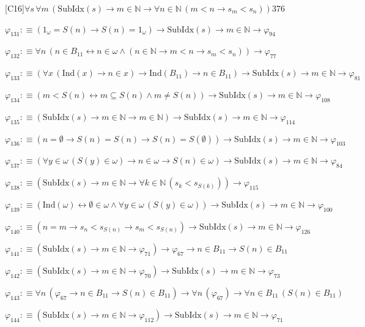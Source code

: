 \begin{fullproof}{[C16]}{$\forall s\,\forall m\,(\mathrm{SubIdx}(s) \to m \in \mathbb{N} \to \forall n \in \mathbb{N}\,(m < n \to s_{m} < s_{n}))$}{376}
\begin{abbrevlist}
\item $\varphi_{131} :\equiv (1_{\omega} = S(n) \to S(n) = 1_{\omega}) \to \mathrm{SubIdx}(s) \to m \in \mathbb{N} \to \varphi_{94}$
\item $\varphi_{132} :\equiv \forall n\,(n \in B_{11} \leftrightarrow n \in \omega \land (n \in \mathbb{N} \to m < n \to s_{m} < s_{n})) \to \varphi_{77}$
\item $\varphi_{133} :\equiv (\forall x\,(\mathrm{Ind}(x) \to n \in x) \to \mathrm{Ind}(B_{11}) \to n \in B_{11}) \to \mathrm{SubIdx}(s) \to m \in \mathbb{N} \to \varphi_{81}$
\item $\varphi_{134} :\equiv (m < S(n) \leftrightarrow m \subseteq S(n) \land m \neq S(n)) \to \mathrm{SubIdx}(s) \to m \in \mathbb{N} \to \varphi_{108}$
\item $\varphi_{135} :\equiv (\mathrm{SubIdx}(s) \to m \in \mathbb{N} \to m \in \mathbb{N}) \to \mathrm{SubIdx}(s) \to m \in \mathbb{N} \to \varphi_{114}$
\item $\varphi_{136} :\equiv (n = \emptyset \to S(n) = S(n) \to S(n) = S(\emptyset)) \to \mathrm{SubIdx}(s) \to m \in \mathbb{N} \to \varphi_{103}$
\item $\varphi_{137} :\equiv (\forall y \in \omega\,(S(y) \in \omega) \to n \in \omega \to S(n) \in \omega) \to \mathrm{SubIdx}(s) \to m \in \mathbb{N} \to \varphi_{84}$
\item $\varphi_{138} :\equiv (\mathrm{SubIdx}(s) \to m \in \mathbb{N} \to \forall k \in \mathbb{N}\,(s_{k} < s_{S(k)})) \to \varphi_{115}$
\item $\varphi_{139} :\equiv (\mathrm{Ind}(\omega) \leftrightarrow \emptyset \in \omega \land \forall y \in \omega\,(S(y) \in \omega)) \to \mathrm{SubIdx}(s) \to m \in \mathbb{N} \to \varphi_{100}$
\item $\varphi_{140} :\equiv (n = m \to s_{n} < s_{S(n)} \to s_{m} < s_{S(n)}) \to \mathrm{SubIdx}(s) \to m \in \mathbb{N} \to \varphi_{126}$
\item $\varphi_{141} :\equiv (\mathrm{SubIdx}(s) \to m \in \mathbb{N} \to \varphi_{71}) \to \varphi_{67} \to n \in B_{11} \to S(n) \in B_{11}$
\item $\varphi_{142} :\equiv (\mathrm{SubIdx}(s) \to m \in \mathbb{N} \to \varphi_{70}) \to \mathrm{SubIdx}(s) \to m \in \mathbb{N} \to \varphi_{73}$
\item $\varphi_{143} :\equiv \forall n\,(\varphi_{67} \to n \in B_{11} \to S(n) \in B_{11}) \to \forall n\,(\varphi_{67}) \to \forall n \in B_{11}\,(S(n) \in B_{11})$
\item $\varphi_{144} :\equiv (\mathrm{SubIdx}(s) \to m \in \mathbb{N} \to \varphi_{112}) \to \mathrm{SubIdx}(s) \to m \in \mathbb{N} \to \varphi_{71}$

\end{abbrevlist}
\end{fullproof}
